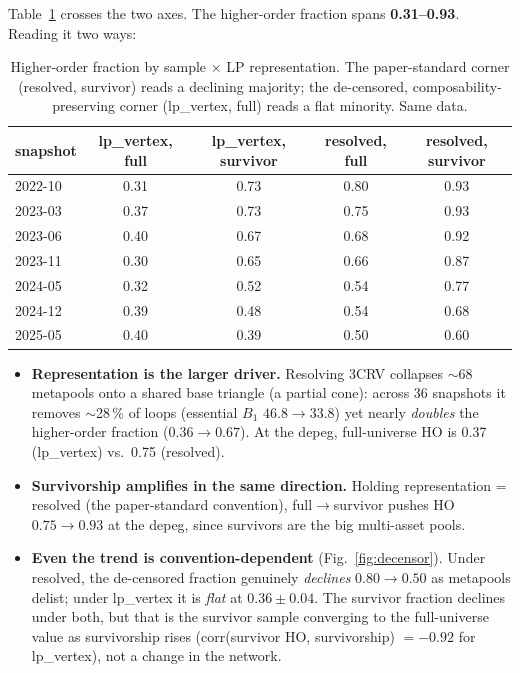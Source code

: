 \documentclass[10pt,twocolumn]{article}
\newcommand{\percent}{\%}
\newcommand{\num}[1]{#1}
\newcommand{\SI}[2]{#1\,#2}
\begin{document}
Table~\ref{tab:2x2} crosses the two axes. The higher-order fraction spans
\textbf{0.31--0.93}. Reading it two ways:

\begin{table}[t]
\centering
\caption{Higher-order fraction by sample $\times$ LP representation. The paper-standard
corner (resolved, survivor) reads a declining majority; the de-censored,
composability-preserving corner (lp\_vertex, full) reads a flat minority. Same data.}
\label{tab:2x2}
\small
\begin{tabular}{lcccc}
\toprule
snapshot & lp\_vertex, full & lp\_vertex, survivor & resolved, full & resolved, survivor \\
\midrule
2022-10 & 0.31 & 0.73 & 0.80 & 0.93 \\
2023-03 & 0.37 & 0.73 & 0.75 & 0.93 \\
2023-06 & 0.40 & 0.67 & 0.68 & 0.92 \\
2023-11 & 0.30 & 0.65 & 0.66 & 0.87 \\
2024-05 & 0.32 & 0.52 & 0.54 & 0.77 \\
2024-12 & 0.39 & 0.48 & 0.54 & 0.68 \\
2025-05 & 0.40 & 0.39 & 0.50 & 0.60 \\
\bottomrule
\end{tabular}
\end{table}

\begin{itemize}
\item \textbf{Representation is the larger driver.} Resolving 3CRV collapses $\sim$68
metapools onto a shared base triangle (a partial cone): across \num{36} snapshots it
removes $\sim$\SI{28}{\percent} of loops (essential $B_1$ $46.8\to33.8$) yet nearly
\emph{doubles} the higher-order fraction ($0.36\to0.67$). At the depeg, full-universe HO is
\num{0.37} (lp\_vertex) vs.\ \num{0.75} (resolved).
\item \textbf{Survivorship amplifies in the same direction.} Holding representation =
resolved (the paper-standard convention), full$\to$survivor pushes HO $0.75\to0.93$ at the
depeg, since survivors are the big multi-asset pools.
\item \textbf{Even the trend is convention-dependent} (Fig.~\ref{fig:decensor}). Under
resolved, the de-censored fraction genuinely \emph{declines} $0.80\to0.50$ as metapools
delist; under lp\_vertex it is \emph{flat} at $0.36\pm0.04$. The survivor fraction declines
under both, but that is the survivor sample converging to the full-universe value as
survivorship rises (corr(survivor HO, survivorship) $=-0.92$ for lp\_vertex), not a change
in the network.
\end{itemize}
\end{document}
